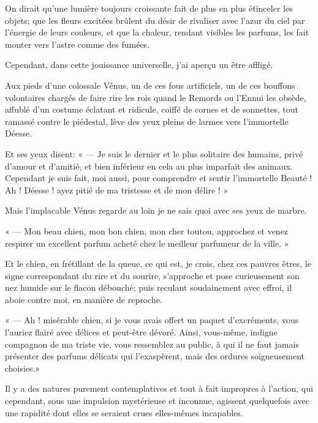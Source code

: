 On dirait qu’une lumière toujours croissante fait de
plus en plus étinceler les objets; que les fleurs excitées brûlent du
désir de rivaliser avec l’azur du ciel par
l’énergie de leurs couleurs, et que la chaleur,
rendant visibles les parfums, les fait monter vers
l’astre comme des fumées.

Cependant, dans cette jouissance universelle, j’ai
aperçu un être affligé.

Aux pieds d’une colossale Vénus, un de ces fous
artificiels, un de ces bouffons volontaires chargés de faire rire les
rois quand le Remords ou l’Ennui les obsède, affublé
d’un costume éclatant et ridicule, coiffé de cornes et
de sonnettes, tout ramassé contre le piédestal, lève des yeux pleins de
larmes vers l’immortelle Déesse.

Et ses yeux disent: « --- Je suis le dernier et le plus solitaire des
humains, privé d’amour et d’amitié,
et bien inférieur en cela au plus imparfait des animaux. Cependant je
suis fait, moi aussi, pour comprendre et sentir
l’immortelle Beauté ! Ah ! Déesse ! ayez pitié de ma
tristesse et de mon délire ! »

Mais l’implacable Vénus regarde au loin je ne sais quoi
avec ses yeux de marbre.


« --- Mon beau chien, mon bon chien, mon cher toutou, approchez et venez
respirer un excellent parfum acheté chez le meilleur parfumeur de la
ville. »

Et le chien, en frétillant de la queue, ce qui est, je crois, chez ces
pauvres êtres, le signe correspondant du rire et du sourire,
s’approche et pose curieusement son nez humide sur le
flacon débouché; puis reculant soudainement avec effroi, il aboie
contre moi, en manière de reproche.

« --- Ah ! misérable chien, si je vous avais offert un paquet
d’excréments, vous l’auriez flairé
avec délices et peut{}-être dévoré. Ainsi, vous{}-même, indigne
compagnon de ma triste vie, vous ressemblez au public, à qui il ne faut
jamais présenter des parfums délicats qui
l’exaspèrent, mais des ordures soigneusement choisies.»



Il y a des natures purement contemplatives et tout à fait impropres à
l’action, qui cependant, sous une impulsion
mystérieuse et inconnue, agissent quelquefois avec une rapidité dont
elles se seraient crues elles{}-mêmes incapables.

